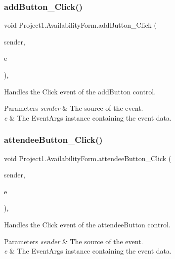 \subsubsection{\texorpdfstring{add\+Button\+\_\+\+Click()}{addButton\_Click()}}
{\footnotesize\ttfamily void Project1.\+Availability\+Form.\+add\+Button\+\_\+\+Click (\begin{DoxyParamCaption}\item[{object}]{sender,  }\item[{Event\+Args}]{e }\end{DoxyParamCaption})\hspace{0.3cm}{\ttfamily [inline]}, {\ttfamily [private]}}



Handles the Click event of the add\+Button control. 


\begin{DoxyParams}{Parameters}
{\em sender} & The source of the event.\\
\hline
{\em e} & The Event\+Args instance containing the event data.\\
\hline
\end{DoxyParams}
\mbox{\label{classProject1_1_1AvailabilityForm_aefcd030d389cf6e1882c74d171de373a}} 
\subsubsection{\texorpdfstring{attendee\+Button\+\_\+\+Click()}{attendeeButton\_Click()}}
{\footnotesize\ttfamily void Project1.\+Availability\+Form.\+attendee\+Button\+\_\+\+Click (\begin{DoxyParamCaption}\item[{object}]{sender,  }\item[{Event\+Args}]{e }\end{DoxyParamCaption})\hspace{0.3cm}{\ttfamily [inline]}, {\ttfamily [private]}}



Handles the Click event of the attendee\+Button control. 


\begin{DoxyParams}{Parameters}
{\em sender} & The source of the event.\\
\hline
{\em e} & The Event\+Args instance containing the event data.\\
\hline
\end{DoxyParams}
\mbox{\label{classProject1_1_1AvailabilityForm_a81c994e26bad20a9a3117f921df3ddd6}} 
